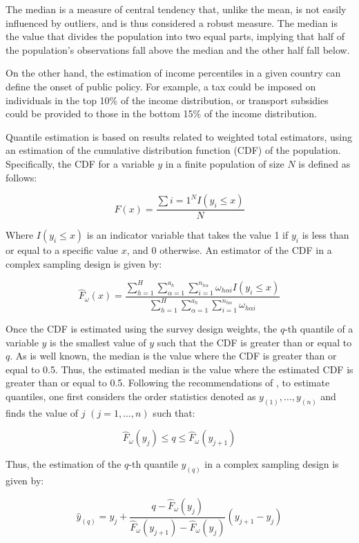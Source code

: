 \documentclass[
  12pt,
]{book}
\begin{document}
The median is a measure of central tendency that, unlike the mean, is not easily influenced by outliers, and is thus considered a robust measure. The median is the value that divides the population into two equal parts, implying that half of the population's observations fall above the median and the other half fall below.

On the other hand, the estimation of income percentiles in a given country can define the onset of public policy. For example, a tax could be imposed on individuals in the top 10\% of the income distribution, or transport subsidies could be provided to those in the bottom 15\% of the income distribution.

Quantile estimation is based on results related to weighted total estimators, using an estimation of the cumulative distribution function (CDF) of the population. Specifically, the CDF for a variable \(y\) in a finite population of size \(N\) is defined as follows:

\[
F(x) = \frac{\sum{i=1}^{N}I(y_i \leq x) }{N}
\]

Where \(I(y_i \leq x)\) is an indicator variable that takes the value 1 if \(y_i\) is less than or equal to a specific value \(x\), and 0 otherwise. An estimator of the CDF in a complex sampling design is given by:

\[
\hat{F}_{\omega}(x) = \frac{\sum_{h=1}^{H}\sum_{\alpha=1}^{a_{h}}\sum_{i=1}^{n_{h\alpha}}\omega_{h\alpha i}I(y_{i}\leq x)}{\sum_{h=1}^{H}\sum_{\alpha=1}^{a_{h}}\sum_{i=1}^{n_{h\alpha}}\omega_{h\alpha i}}
\]

Once the CDF is estimated using the survey design weights, the \(q\)-th quantile of a variable \(y\) is the smallest value of \(y\) such that the CDF is greater than or equal to \(q\). As is well known, the median is the value where the CDF is greater than or equal to 0.5. Thus, the estimated median is the value where the estimated CDF is greater than or equal to 0.5. Following the recommendations of \citet{Heeringa_West_Berglund_2017}, to estimate quantiles, one first considers the order statistics denoted as \(y_{(1)},\ldots,y_{(n)}\) and finds the value of \(j\) \((j=1,\ldots,n)\) such that:

\[
\hat{F}_{\omega}(y_{j})\leq q\leq\hat{F}_{\omega}(y_{j+1})
\]

Thus, the estimation of the \(q\)-th quantile \(y_{(q)}\) in a complex sampling design is given by:

\[
\hat{y}_{(q)} = y_{j}+\frac{q-\hat{F}_{\omega}(y_{j})}{\hat{F}_{\omega}(y_{j+1})-\hat{F}_{\omega}(y_{j})}(y_{j+1}-y_{j})
\]
\end{document}
